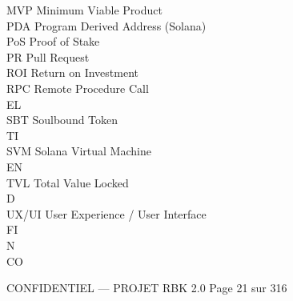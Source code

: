 MVP Minimum Viable Product\\
\vspace{0.5em}
PDA Program Derived Address (Solana)\\
\vspace{0.5em}
PoS Proof of Stake\\
\vspace{0.5em}
PR Pull Request\\
\vspace{0.5em}
ROI Return on Investment\\
\vspace{0.5em}
RPC Remote Procedure Call\\
\vspace{0.5em}
\vspace{0.5em}
\vspace{0.5em}
\vspace{0.5em}
EL\\
SBT Soulbound Token\\
\vspace{0.5em}
\vspace{0.5em}
\vspace{0.5em}
\vspace{0.5em}
TI\\
SVM Solana Virtual Machine\\
\vspace{0.5em}
\vspace{0.5em}
\vspace{0.5em}
\vspace{0.5em}
EN\\
TVL Total Value Locked\\
\vspace{0.5em}
\vspace{0.5em}
\vspace{0.5em}
\vspace{0.5em}
D\\
UX/UI User Experience / User Interface\\
\vspace{0.5em}
\vspace{0.5em}
\vspace{0.5em}
\vspace{0.5em}
FI\\
N\\
CO\\
\vspace{0.5em}
\vspace{0.5em}
\vspace{0.5em}
\vspace{0.5em}
\begin{confidential}CONFIDENTIEL — PROJET RBK 2.0                              Page 21 sur 316\end{confidential}
